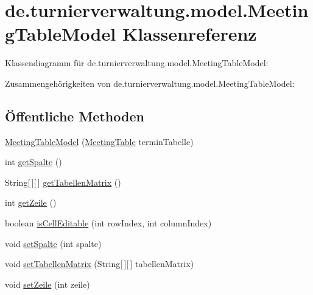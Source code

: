 \hypertarget{classde_1_1turnierverwaltung_1_1model_1_1_meeting_table_model}{}\section{de.\+turnierverwaltung.\+model.\+Meeting\+Table\+Model Klassenreferenz}
\label{classde_1_1turnierverwaltung_1_1model_1_1_meeting_table_model}


Klassendiagramm für de.\+turnierverwaltung.\+model.\+Meeting\+Table\+Model\+:


Zusammengehörigkeiten von de.\+turnierverwaltung.\+model.\+Meeting\+Table\+Model\+:
\subsection*{Öffentliche Methoden}
\begin{DoxyCompactItemize}
\item 
\hyperlink{classde_1_1turnierverwaltung_1_1model_1_1_meeting_table_model_a849fbc99ba7f0011d23d178c04e8c7f8}{Meeting\+Table\+Model} (\hyperlink{classde_1_1turnierverwaltung_1_1model_1_1_meeting_table}{Meeting\+Table} termin\+Tabelle)
\item 
int \hyperlink{classde_1_1turnierverwaltung_1_1model_1_1_meeting_table_model_a2ead7e61cc97608cff24ed64278cc91c}{get\+Spalte} ()
\item 
String\mbox{[}$\,$\mbox{]}\mbox{[}$\,$\mbox{]} \hyperlink{classde_1_1turnierverwaltung_1_1model_1_1_meeting_table_model_ae290660cd88156e960fdb1ab88e1f353}{get\+Tabellen\+Matrix} ()
\item 
int \hyperlink{classde_1_1turnierverwaltung_1_1model_1_1_meeting_table_model_abebcce972c09eb336975ea12190b38da}{get\+Zeile} ()
\item 
boolean \hyperlink{classde_1_1turnierverwaltung_1_1model_1_1_meeting_table_model_a2e413afd98d0682e4f3669a6b1e576d4}{is\+Cell\+Editable} (int row\+Index, int column\+Index)
\item 
void \hyperlink{classde_1_1turnierverwaltung_1_1model_1_1_meeting_table_model_a8231c3f715730b2d23899f0a01aab8f2}{set\+Spalte} (int spalte)
\item 
void \hyperlink{classde_1_1turnierverwaltung_1_1model_1_1_meeting_table_model_a99c40534c6fa1a9d02c2e86fa14a08ef}{set\+Tabellen\+Matrix} (String\mbox{[}$\,$\mbox{]}\mbox{[}$\,$\mbox{]} tabellen\+Matrix)
\item 
void \hyperlink{classde_1_1turnierverwaltung_1_1model_1_1_meeting_table_model_a78be440fc042e2af3eca4cd19a9a86a8}{set\+Zeile} (int zeile)
\end{DoxyCompactItemize}


